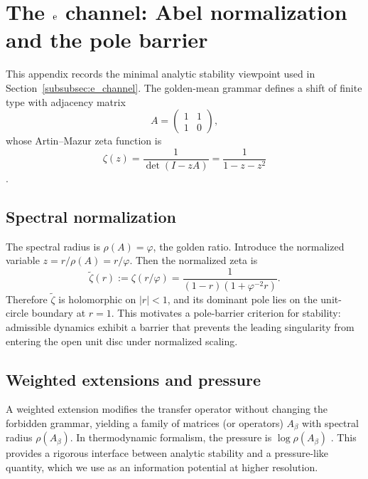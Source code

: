 
\section{The \texorpdfstring{$\mathrm{e}$}{e} channel: Abel normalization and the pole barrier}
\label{app:abel_pole_barrier}

This appendix records the minimal analytic stability viewpoint used in Section~\ref{subsubsec:e_channel}.
The golden-mean grammar defines a shift of finite type with adjacency matrix
\[
A=\begin{pmatrix}
1 & 1\\
1 & 0
\end{pmatrix},
\]
whose Artin--Mazur zeta function is
\[
\zeta(z)=\frac{1}{\det(I-zA)}=\frac{1}{1-z-z^2}
\]
\cite{ArtinMazur1965,ParryPollicott1990}.

\subsection{Spectral normalization}
The spectral radius is $\rho(A)=\varphi$, the golden ratio.
Introduce the normalized variable $z=r/\rho(A)=r/\varphi$.
Then the normalized zeta is
\[
\tilde{\zeta}(r):=\zeta(r/\varphi)=\frac{1}{(1-r)\left(1+\varphi^{-2}r\right)}.
\]
Therefore $\tilde{\zeta}$ is holomorphic on $|r|<1$, and its dominant pole lies on the unit-circle boundary at $r=1$.
This motivates a pole-barrier criterion for stability: admissible dynamics exhibit a barrier that prevents the leading singularity from entering the open unit disc under normalized scaling.

\subsection{Weighted extensions and pressure}
A weighted extension modifies the transfer operator without changing the forbidden grammar, yielding a family of matrices (or operators) $A_\beta$ with spectral radius $\rho(A_\beta)$.
In thermodynamic formalism, the pressure is $\log\rho(A_\beta)$ \cite{Ruelle1978}.
This provides a rigorous interface between analytic stability and a pressure-like quantity, which we use as an information potential at higher resolution.



